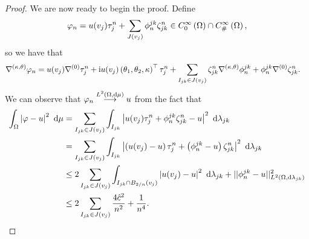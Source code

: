 \begin{proof}
	We are now ready to begin the proof.
	Define 
	\begin{align*}	
		\varphi_n = u(v_j)\tau_j^n + \sum_{J(v_j)}\phi^{jk}_n\zeta_{jk}^n\in C^{\infty}_{0}\left( \Omega \right)\cap C^{\infty}_{\#}\left( \Omega \right),
	\end{align*}
	so we have that
	\begin{align*}
		\nabla^{\left( \kappa, \theta \right)}\varphi_n 
		&= u(v_j)\nabla^{(0)}\tau_j^n + \mathrm{i} u(v_j)\left( \theta_1,\theta_2,\kappa \right)^\top\tau_j^n + \sum_{I_{jk}\in J(v_j)}\zeta_{jk}^n\nabla^{\left( \kappa, \theta \right)}\phi_n^{jk} + \phi_n^{jk}\nabla^{(0)}\zeta_{jk}^n.
	\end{align*}
	We can observe that $\varphi_n\overset{L^{2}\left( \Omega,\mathrm{d} \mu \right)}{\longrightarrow}u$ from the fact that
	\begin{align*}
		\int_{\Omega} \left\lvert \varphi - u \right\rvert^2  \ \mathrm{d}\mu
		&= \sum_{I_{jk}\in J(v_j)}\int_{I_{jk}} \left\lvert u(v_j)\tau_j^n + \phi_n^{jk}\zeta_{jk}^n - u \right\rvert^2  \ \mathrm{d}\lambda_{jk} \\
		&= \sum_{I_{jk}\in J(v_j)}\int_{I_{jk}} \left\lvert \left( u(v_j)-u \right)\tau_j^n + \left( \phi_n^{jk}-u \right)\zeta_{jk}^n \right\rvert^2  \ \mathrm{d}\lambda_{jk} \\
		&\leq 2\sum_{I_{jk}\in J(v_j)} \int_{I_{jk}\cap B_{2/n}(v_j)} \left\lvert u(v_j)-u \right\rvert^2  \ \mathrm{d}\lambda_{jk} + \lvert\lvert \phi_n^{jk}-u \rvert\rvert_{L^{2}\left( \Omega,\mathrm{d} \lambda_{jk} \right)}^2 \\
		&\leq 2\sum_{I_{jk}\in J(v_j)} \frac{4\hat{c}^2}{n^2} + \frac{1}{n^4}.
	\end{align*}
	

\end{proof}
